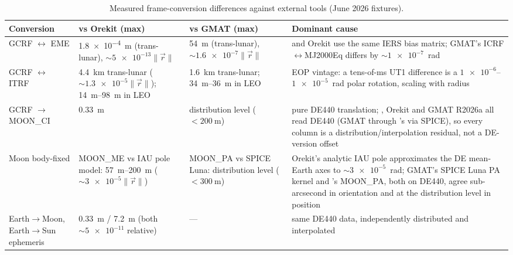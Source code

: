 \begin{table}[H]
  \centering
  \caption{Measured frame-conversion differences against external tools
    (June 2026 fixtures).}
  \label{tab:fc-accuracy}
  \small
  \begin{tabularx}{\textwidth}{>{\raggedright\arraybackslash}p{2.1cm} L L L}
    \toprule
    Conversion & vs Orekit (max) & vs GMAT (max) & Dominant cause \\
    \midrule
    GCRF $\leftrightarrow$ EME
      & \SI{1.8e-4}{\meter} (trans-lunar), $\sim\num{5e-13}\lVert\vec{r}\rVert$
      & \SI{54}{\meter} (trans-lunar), $\sim\num{1.6e-7}\lVert\vec{r}\rVert$
      & \lupnt{} and Orekit use the same IERS bias matrix; GMAT's
        ICRF$\leftrightarrow$MJ2000Eq differs by $\sim\num{1e-7}$~rad \\
    GCRF $\leftrightarrow$ ITRF
      & \SI{4.4}{\kilo\meter} trans-lunar ($\sim\num{1.3e-5}\lVert\vec{r}\rVert$); \SIrange{14}{98}{\meter} in LEO
      & \SI{1.6}{\kilo\meter} trans-lunar; \SIrange{34}{36}{\meter} in LEO
      & EOP vintage: a tens-of-ms UT1 difference is a
        $\num{1e-6}$--$\num{1e-5}$~rad polar rotation, scaling with radius \\
    GCRF $\to$ MOON\_CI
      & \SI{0.33}{\meter}
      & distribution level ($<\SI{200}{\meter}$)
      & pure DE440 translation; \lupnt{}, Orekit and GMAT R2026a all read DE440
        (GMAT through \lupnt{}'s  via SPICE), so every column is
        a distribution/interpolation residual, not a DE-version offset \\
    Moon body-fixed
      & MOON\_ME vs IAU pole model: \SIrange{57}{200}{\meter} ($\sim\num{3e-5}\lVert\vec{r}\rVert$)
      & MOON\_PA vs SPICE Luna: distribution level ($<\SI{300}{\meter}$)
      & Orekit's analytic IAU pole approximates the DE mean-Earth axes to
        $\sim\num{3e-5}$~rad; GMAT's SPICE Luna PA kernel and \lupnt{}'s
        MOON\_PA, both on DE440, agree sub-arcsecond in orientation and at the
        distribution level in position \\
    Earth$\to$Moon, Earth$\to$Sun ephemeris
      & \SI{0.33}{\meter} / \SI{7.2}{\meter} (both $\sim\num{5e-11}$ relative)
      & ---
      & same DE440 data, independently distributed and interpolated \\
    \bottomrule
  \end{tabularx}
\end{table}

